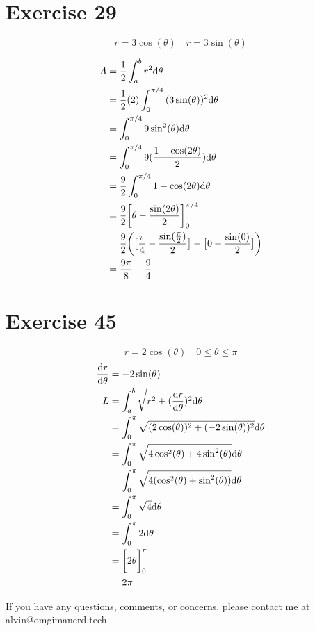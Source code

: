\documentclass{math}
\begin{document}
\section*{Exercise 29}
\[ r = 3\cos(\theta) \quad r = 3\sin(\theta) \]
\begin{center}
\end{center}
\begin{align*}
  A &= \frac{1}{2}\int_{a}^{b}{r^{2}\mathrm{d}{\theta}} \\
  &= \frac{1}{2}(2)\int_{0}^{\pi/4}{(3\sin(\theta))^{2}\mathrm{d}{\theta}} \\
  &= \int_{0}^{\pi/4}{9\sin^{2}(\theta)\mathrm{d}{\theta}} \\
  &= \int_{0}^{\pi/4}{9(\frac{1-\cos(2\theta)}{2})\mathrm{d}{\theta}} \\
  &= \frac{9}{2}\int_{0}^{\pi/4}{1-\cos(2\theta)\mathrm{d}{\theta}} \\
  &= \frac{9}{2}\bigg[\theta-\frac{\sin(2\theta)}{2}\bigg]_{0}^{\pi/4} \\
  &= \frac{9}{2}\bigg(\big[\frac{\pi}{4}-\frac{\sin(\frac{\pi}{2})}{2}\big]-
    \big[0-\frac{\sin(0)}{2}\big]\bigg) \\
  &= \frac{9\pi}{8}-\frac{9}{4}
\end{align*}

\section*{Exercise 45}
\[ r = 2\cos(\theta) \quad 0 \leq \theta \leq \pi \]
\begin{align*}
  \frac{\mathrm{d}{r}}{\mathrm{d}{\theta}} &= -2\sin(\theta) \\
  L &= \int_{a}^{b}{\sqrt{r^{2}+(\frac{\mathrm{d}{r}}{\mathrm{d}{\theta}})^{2}}\mathrm{d}{\theta}} \\
  &= \int_{0}^{\pi}
    {\sqrt{(2\cos(\theta))^{2}+(-2\sin(\theta))^{2}}\mathrm{d}{\theta}} \\
  &= \int_{0}^{\pi}
    {\sqrt{4\cos^{2}(\theta)+4\sin^{2}(\theta)}\mathrm{d}{\theta}} \\
  &= \int_{0}^{\pi}
    {\sqrt{4(\cos^{2}(\theta)+\sin^{2}(\theta))}\mathrm{d}{\theta}} \\
  &= \int_{0}^{\pi}{\sqrt{4}\mathrm{d}{\theta}} \\
  &= \int_{0}^{\pi}{2\mathrm{d}{\theta}} \\
  &= \bigg[2\theta\bigg]_{0}^{\pi} \\
  &= 2\pi
\end{align*}

\begin{center}
  If you have any questions, comments, or concerns, please contact me at
  alvin@omgimanerd.tech
\end{center}
\end{document}
